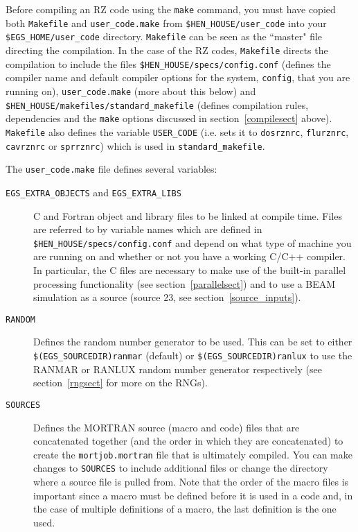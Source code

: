 \documentclass[12pt,twoside]{article}  %
\begin{document}
Before compiling an RZ code using the {\tt make}
command, you must have copied both
{\tt Makefile} and {\tt user\_code.make} from
{\tt \$HEN\_HOUSE/user\_code} into your {\tt \$EGS\_HOME/user\_code}
directory.  {\tt Makefile} can be seen as the ``master" file directing
the compilation.  In the case of the RZ codes, {\tt Makefile} directs
the compilation to include the files {\tt \$HEN\_HOUSE/specs/config.conf}
(defines the compiler name and default compiler options for the system,
{\tt config}, that you are running on), {\tt user\_code.make} (more about
this below) and {\tt \$HEN\_HOUSE/makefiles/standard\_makefile}
(defines compilation rules, dependencies and the {\tt make} options
discussed in section~\ref{compilesect} above).  {\tt Makefile} also
defines the variable {\tt USER\_CODE} (i.e. sets it to {\tt dosrznrc},
{\tt flurznrc}, {\tt cavrznrc} or {\tt sprrznrc}) which is used
in {\tt standard\_makefile}.

The {\tt user\_code.make} file defines several variables:
\begin{description}
\item [{\tt EGS\_EXTRA\_OBJECTS} and {\tt EGS\_EXTRA\_LIBS}] C and Fortran
object and library files to be linked at compile time.  Files are referred
to by variable names which are defined in {\tt \$HEN\_HOUSE/specs/config.conf}
and depend on what type of machine you are running on and whether or not you
have a working C/C++ compiler.  In particular, the C files are necessary
to make use of the built-in parallel processing functionality
(see section~\ref{parallelsect}) and to use a BEAM simulation
as a source (source 23, see section~\ref{source_inputs}).
\item [{\tt RANDOM}] Defines the random number generator to be used.  This
can be set to either\\ {\tt \$(EGS\_SOURCEDIR)ranmar} (default) or
{\tt \$(EGS\_SOURCEDIR)ranlux} to use the RANMAR or RANLUX random number
generator respectively (see section~\ref{rngsect} for more on the RNGs).
\item [{\tt SOURCES}] Defines the MORTRAN source (macro and code) files that
are concatenated together (and the order in which they are concatenated)
to create the {\tt mortjob.mortran} file that is ultimately compiled.
You can make changes to {\tt SOURCES} to include additional files or
change the directory where a source file is pulled from.
Note that the order of the macro files is important since a macro
must be defined before it is used in a code and, in the case of multiple
definitions of a macro, the last definition is the one used.
\end{description}
\end{document}
